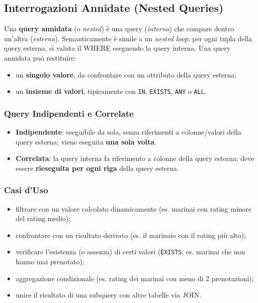 \documentclass[12pt, a4paper]{article}
\begin{document}
\subsection{Interrogazioni Annidate (Nested Queries)}

Una \textbf{query annidata} (o \textit{nested}) è una query (\textit{interna}) che compare dentro un'altra (\textit{esterna}). Semanticamente è simile a un \textit{nested loop}: per ogni tupla della query esterna, si valuta il WHERE eseguendo la query interna. Una query annidata può restituire:
\begin{itemize}
    \item un \textbf{singolo valore}, da confrontare con un attributo della query esterna;
    \item un \textbf{insieme di valori}, tipicamente con \texttt{IN}, \texttt{EXISTS}, \texttt{ANY} o \texttt{ALL}.
\end{itemize}

\subsubsection{Query Indipendenti e Correlate}
\begin{itemize}
    \item \textbf{Indipendente}: eseguibile da sola, senza riferimenti a colonne/valori della query esterna; viene eseguita \textbf{una sola volta}.
    \item \textbf{Correlata}: la query interna fa riferimento a colonne della query esterna; deve essere \textbf{rieseguita per ogni riga} della query esterna.
\end{itemize}

\subsubsection{Casi d'Uso}
\begin{itemize}
    \item filtrare con un valore calcolato dinamicamente (es. marinai con rating minore del rating medio);
    \item confrontare con un risultato derivato (es. il marinaio con il rating più alto);
    \item verificare l'esistenza (o assenza) di certi valori (\texttt{EXISTS}; es. marinai che non hanno mai prenotato);
    \item aggregazione condizionale (es. rating dei marinai con meno di 2 prenotazioni);
    \item unire il risultato di una subquery con altre tabelle via JOIN.
\end{itemize}
\end{document}
